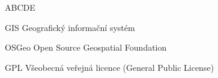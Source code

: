 
\begin{seznamzkratek}{ABCDE}

	      {GIS}
	      {Geografický informační systém}

	      {OSGeo}
	      {Open Source Geospatial Foundation}

	      {GPL}
	      {Všeobecná veřejná licence (General Public License)}

\end{seznamzkratek}